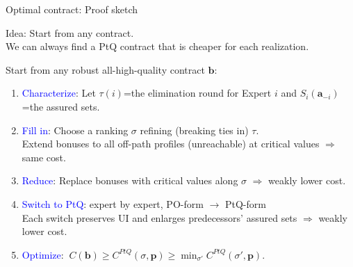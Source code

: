 \documentclass[10pt,aspectratio=169, compressed]{beamer}
\begin{document}
\begin{frame}[label=proofsketch]{Optimal contract: Proof sketch}

Idea: 
Start from any contract.\\
We can always find a PtQ contract that is cheaper for each realization.
\bigskip

{\footnotesize Start from any robust all-high-quality contract $\mathbf b$:

\begin{enumerate}
  \item \textcolor{blue}{Characterize}: Let  $\tau(i)$=the elimination round for Expert $i$ and $S_i(\mathbf a_{-i})$=the assured sets.
  \smallskip
  \item \textcolor{blue}{Fill in}: Choose a ranking $\sigma$ refining (breaking ties in) $\tau$. \\
  				Extend bonuses to all off-path profiles (unreachable) at critical values \hfill $\Rightarrow$ same cost.
  \smallskip
  \item \textcolor{blue}{Reduce}: Replace bonuses with critical values along $\sigma$ \hfill $\Rightarrow$ weakly lower cost.
  \smallskip
  \item \textcolor{blue}{Switch to PtQ}: expert by expert, PO-form $\to$ PtQ-form \\
  Each switch preserves UI and enlarges predecessors' assured sets
   \hfill $\Rightarrow$ weakly lower cost.
  \smallskip
  \item \textcolor{blue}{Optimize}: $\ C(\mathbf b) \geq C^{PtQ}(\sigma,\mathbf p) \geq \min_{\sigma'} C^{PtQ}(\sigma',\mathbf p)$.
\end{enumerate}
}



\hfill\hyperlink{optcontract}{}
\end{frame}
\end{document}
